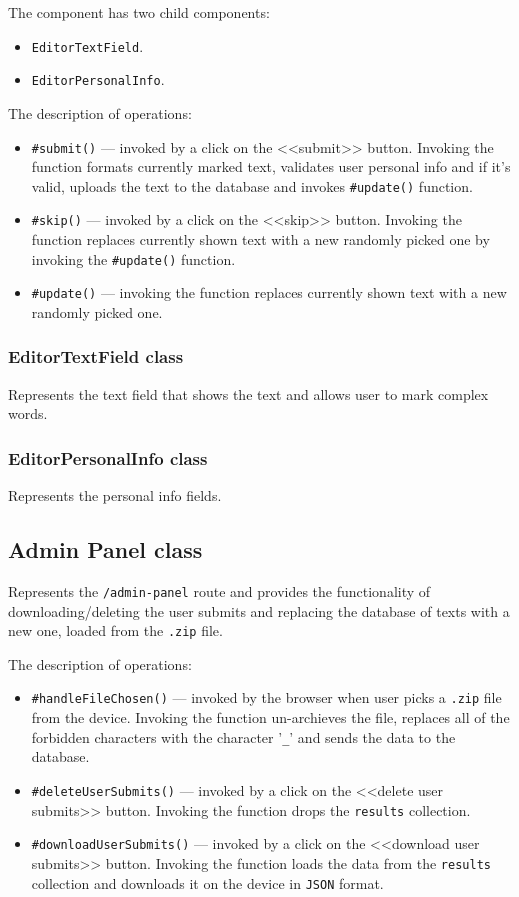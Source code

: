 \documentclass[a4paper,14pt,oneside,final]{memoir}
\begin{document}
The component has two child components:
\begin{itemize}
    \item \texttt{EditorTextField}.
    \item \texttt{EditorPersonalInfo}.
\end{itemize}

The description of operations:
\begin{itemize}
    \item \texttt{\#submit()} --- invoked by a click on the <<submit>> button. Invoking the function formats currently marked text, validates user personal info and if it's valid, uploads the text to the database and invokes \texttt{\#update()} function.
    \item \texttt{\#skip()} --- invoked by a click on the <<skip>> button. Invoking the function replaces currently shown text with a new randomly picked one by invoking the \texttt{\#update()} function.
    \item \texttt{\#update()} --- invoking the function replaces currently shown text with a new randomly picked one.
\end{itemize}

\subsubsection{EditorTextField class}
Represents the text field that shows the text and allows user to mark complex words.

\subsubsection{EditorPersonalInfo class}
Represents the personal info fields.

\subsection{Admin Panel class}
Represents the \texttt{/admin-panel} route and provides the functionality of downloading/deleting the user submits and replacing the database of texts with a new one, loaded from the \texttt{.zip} file.

The description of operations:
\begin{itemize}
    \item \texttt{\#handleFileChosen()} --- invoked by the browser when user picks a \texttt{.zip} file from the device. Invoking the function un-archieves the file, replaces all of the forbidden characters with the character '\texttt{\_}' and sends the data to the database.
    \item \texttt{\#deleteUserSubmits()} --- invoked by a click on the <<delete user submits>> button. Invoking the function drops the \texttt{results} collection.
    \item \texttt{\#downloadUserSubmits()} --- invoked by a click on the <<download user submits>> button. Invoking the function loads the data from the \texttt{results} collection and downloads it on the device in \texttt{JSON} format.
\end{itemize}
\end{document}
